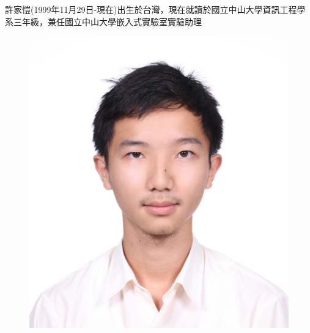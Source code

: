 \documentclass[30pt]{article}
\begin{document}
許家愷(1999年11月29日-現在)出生於台灣，現在就讀於國立中山大學資訊工程學系三年級，兼任國立中山大學嵌入式實驗室實驗助理

\begin{figure}
    \centering
    \includegraphics[width=0.75\linewidth]{10731820-1.JPG}
\end{figure}
\end{document}
